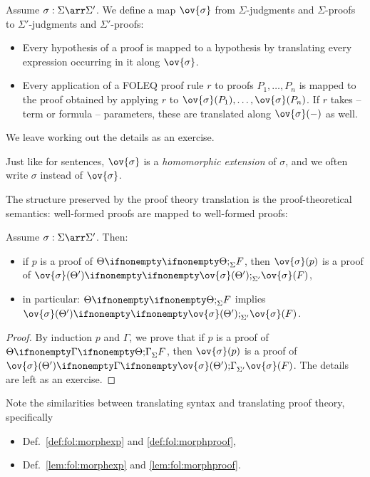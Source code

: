 \begin{definition}\label{def:fol:morphproof}
Assume $\sigma:\Sigma\arr \Sigma'$. We define a map $\ov{\sigma}$ from $\Sigma$-judgments and $\Sigma$-proofs to $\Sigma'$-judgments and $\Sigma'$-proofs:
\begin{itemize}
 \item Every hypothesis of a proof is mapped to a hypothesis by translating every expression occurring in it along $\ov{\sigma}$.
 \item Every application of a FOLEQ proof rule $r$ to proofs $P_1,\ldots,P_n$ is mapped to the proof obtained by applying $r$ to $\ov{\sigma}(P_1),\ldots,\ov{\sigma}(P_n)$. If $r$ takes -- term or formula -- parameters, these are translated along $\ov{\sigma}(-)$ as well.
\end{itemize}
We leave working out the details as an exercise.
\end{definition}

\begin{remark}
Just like for sentences, $\ov{\sigma}$ is a \emph{homomorphic extension} of $\sigma$, and we often write $\sigma$ instead of $\ov{\sigma}$.
\end{remark}

The structure preserved by the proof theory translation is the proof-theoretical semantics: well-formed proofs are mapped to well-formed proofs:

\begin{lemma}\label{lem:fol:morphproof}
Assume $\sigma:\Sigma\arr \Sigma'$. Then:
\begin{itemize}
 \item if $p$ is a proof of $\iscons{\Sigma}{\Theta}{}{F}$, then $\ov{\sigma}(p)$ is a proof of $\iscons{\Sigma'}{\ov{\sigma}(\Theta')}{}{\ov{\sigma}(F)}$,
 \item in particular: $\iscons{\Sigma}{\Theta}{}{F}$ implies $\iscons{\Sigma'}{\ov{\sigma}(\Theta')}{}{\ov{\sigma}(F)}$.
\end{itemize}
\end{lemma}
\begin{proof}
By induction $p$ and $\Gamma$, we prove that if $p$ is a proof of $\iscons{\Sigma}{\Theta}{\Gamma}{F}$, then $\ov{\sigma}(p)$ is a proof of $\iscons{\Sigma'}{\ov{\sigma}(\Theta')}{\Gamma}{\ov{\sigma}(F)}$. The details are left as an exercise.
\end{proof}

\begin{remark}
Note the similarities between translating syntax and translating proof theory, specifically
\begin{itemize}
\item Def.~\ref{def:fol:morphexp} and \ref{def:fol:morphproof},
\item Def.~\ref{lem:fol:morphexp} and \ref{lem:fol:morphproof}.
\end{itemize}
\end{remark}

